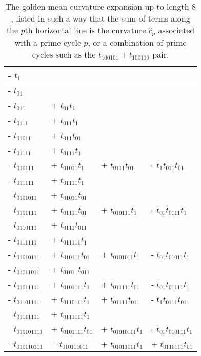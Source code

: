 

\begin{table}
\caption[]{\small
The golden-mean curvature expansion %
up to length
$8$, listed in such a way that the sum of terms along the $p$th horizontal
line is the curvature $\hat{c}_p$ associated with a prime cycle $p$, or a
combination of prime cycles such as the $t_{100101}+t_{100110}$ pair.
  }
\renewcommand{\arraystretch}{0.7}
\begin{tabular}{llll}
- $t_1$ & & & \\ \hline
- $t_{01}$ & & & \\  \hline
- $t_{011}$ &  + $ t_{01}t_1$  & & \\ \hline
- $t_{0111}$ &  + $t_{011}t_{1}$ & & \\ \hline
- $t_{01011}$ &  + $t_{011} t_{01}$  & & \\
- $t_{01111}$ &  + $t_{0111} t_1$ & & \\ \hline
- $t_{010111}$ &  + $t_{01011} t_1$ & + $t_{0111}t_{01}$ & -  $ t_1 t_{011} t_{01}$ \\
- $t_{011111}$ &  + $t_{01111} t_{1} $ & & \\   \hline
- $t_{0101011}$ &  + $t_{01011} t_{01}$ & & \\
- $t_{0101111}$ &  + $t_{01111} t_{01}$ & + $t_{010111} t_1$ & -  $ t_{01} t_{0111} t_1$  \\
- $t_{0110111}$ &  + $t_{0111} t_{011}$  & & \\
- $t_{0111111}$ &  + $t_{011111} t_1$ & & \\ \hline
- $t_{01010111}$ &  + $t_{010111} t_{01}$ & + $t_{0101011} t_1$ & -  $ t_{01} t_{01011} t_1$  \\
- $t_{01011011}$ &  + $t_{01011} t_{011}$ & & \\
- $t_{01011111}$ &  + $t_{0101111} t_1$  &  +
$t_{011111} t_{01}$ & -  $t_{01} t_{01111} t_1$\\
- $t_{01101111}$ &  + $t_{0110111} t_1$  &  +
$t_{01111} t_{011}$& -  $t_1 t_{0111} t_{011}$ \\
- $t_{01111111}$ &  + $t_{0111111} t_1$ & & \\ \hline
- $t_{010101111}$ &  + $t_{0101111} t_{01}$  &  +
$t_{01010111} t_1$ & -  $t_{01} t_{010111} t_1$\\
%
- $t_{010110111}$ &
\,-\, $t_{010111011}$ &
    + $ t_{01011011} t_1$ &  + $t_{0110111} t_{01}$ \\

\end{tabular}
\end{table}
